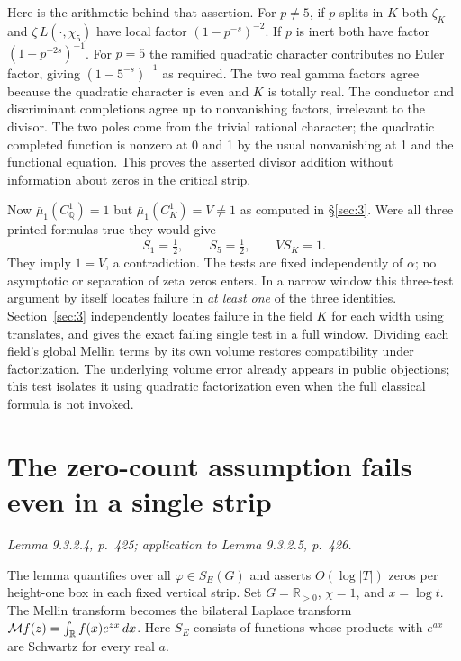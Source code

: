\documentclass[11pt,reqno]{amsart}
\numberwithin{equation}{section}
\newcommand{\Q}{\mathbb Q}\newcommand{\R}{\mathbb R}\newcommand{\C}{\mathbb C}\newcommand{\Z}{\mathbb Z}
\begin{document}
Here is the arithmetic behind that assertion. For \(p\ne5\), if \(p\) splits in \(K\) both \(\zeta_K\) and \(\zeta\,L(\cdot,\chi_5)\) have local factor \((1-p^{-s})^{-2}\). If \(p\) is inert both have factor \((1-p^{-2s})^{-1}\). For \(p=5\) the ramified quadratic character contributes no Euler factor, giving \((1-5^{-s})^{-1}\) as required. The two real gamma factors agree because the quadratic character is even and \(K\) is totally real. The conductor and discriminant completions agree up to nonvanishing factors, irrelevant to the divisor. The two poles come from the trivial rational character; the quadratic completed function is nonzero at 0 and 1 by the usual nonvanishing at 1 and the functional equation. This proves the asserted divisor addition without information about zeros in the critical strip.

Now \(\bar\mu_1(C_\Q^1)=1\) but \(\bar\mu_1(C_K^1)=V\ne1\) as computed in \S\ref{sec:3}. Were all three printed formulas true they would give
\[
       S_1=\tfrac12,\qquad S_5=\tfrac12,\qquad V S_K=1 .
\]
They imply \(1=V\), a contradiction. The tests are fixed independently of \(\alpha\); no asymptotic or separation of zeta zeros enters. In a narrow window this three-test argument by itself locates failure in \emph{at least one} of the three identities. Section~\ref{sec:3} independently locates failure in the field \(K\) for each width using translates, and gives the exact failing single test in a full window. Dividing each field's global Mellin terms by its own volume restores compatibility under factorization. The underlying volume error already appears in public objections; this test isolates it using quadratic factorization even when the full classical formula is not invoked.


\section{The zero-count assumption fails even in a single strip}\label{sec:5}

\textit{Lemma 9.3.2.4, p.~425; application to Lemma 9.3.2.5, p.~426.}\par
The lemma quantifies over all \(\varphi\in S_E(G)\) and asserts \(O(\log |T|)\) zeros per height-one box in each fixed vertical strip. Set \(G=\R_{>0}\), \(\chi=1\), and \(x=\log t\). The Mellin transform becomes the bilateral Laplace transform \(\M f(z)=\int_\R f(x)e^{zx}\,dx\). Here \(S_E\) consists of functions whose products with \(e^{a x}\) are Schwartz for every real \(a\).
\end{document}
